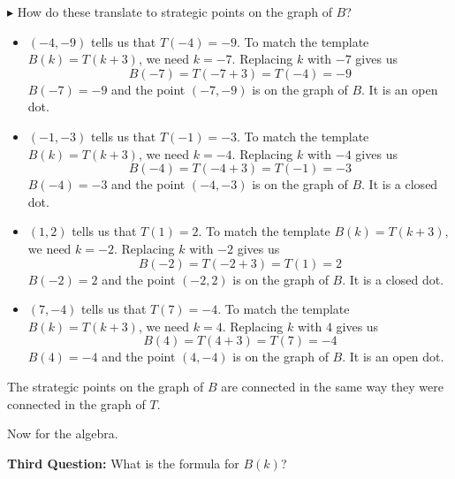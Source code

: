 \documentclass{ximera}
\begin{document}
\textbf{\textcolor{blue!55!black}{$\blacktriangleright$}} How do these translate to strategic points on the graph of $B$?


\begin{itemize}

\item $(-4, -9)$ tells us that $T(-4) = -9$.   
To match the template $B(k) = T(k+3)$, we need $k=-7$.  Replacing $k$ with $-7$ gives us
\[ B(-7) = T(-7 + 3) = T(-4) = -9\]
$B(-7) = -9$ and the point $(-7, -9)$ is on the graph of $B$. It is an open dot. 


\item $(-1, -3)$ tells us that $T(-1) = -3$.   
To match the template $B(k) = T(k+3)$, we need $k=-4$.  Replacing $k$ with $-4$ gives us
\[ B(-4) = T(-4 + 3) = T(-1) = -3\]
$B(-4) = -3$ and the point $(-4, -3)$ is on the graph of $B$. It is a closed dot. 


\item $(1, 2)$ tells us that $T(1) = 2$.   
To match the template $B(k) = T(k+3)$, we need $k=-2$.  Replacing $k$ with $-2$ gives us
\[ B(-2) = T(-2 + 3) = T(1) = 2\]
$B(-2) = 2$ and the point $(-2, 2)$ is on the graph of $B$. It is a closed dot. 


\item $(7, -4)$ tells us that $T(7) = -4$.   
To match the template $B(k) = T(k+3)$, we need $k=4$.  Replacing $k$ with $4$ gives us
\[ B(4) = T(4 + 3) = T(7) = -4\]
$B(4) = -4$ and the point $(4, -4)$ is on the graph of $B$. It is an open dot.


\end{itemize}



The strategic points on the graph of $B$ are connected in the same way they were connected in the graph of $T$.







Now for the algebra.


\textbf{\textcolor{purple!85!blue}{Third Question:}} What is the formula for $B(k)$?
\end{document}
